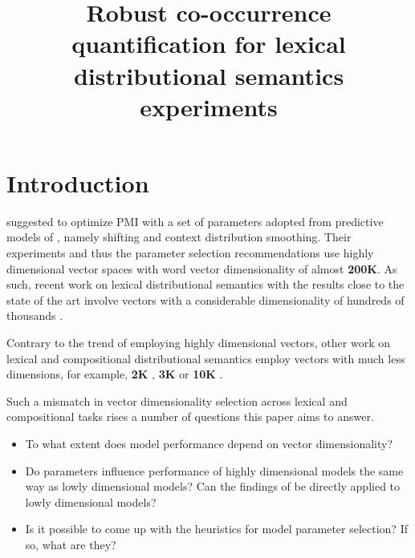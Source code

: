 \documentclass[11pt]{article}
\title{Robust co-occurrence quantification for lexical distributional semantics experiments}
\date{}
\begin{document}
\def\emnlp/{\textit{KS2013}}
\def\PhraseRel/{PhraseRel}

\def\PMI/{$1 \operatorname{PMI}$}
\def\SPMI/{$1 \operatorname{SPMI}$}
\def\CPMI/{$1 \operatorname{CPMI}$}
\def\SCPMI/{$1 \operatorname{SCPMI}$}

\def\NPMI/{$n \operatorname{PMI}$}
\def\NSPMI/{$n \operatorname{SPMI}$}
\def\NCPMI/{$n \operatorname{CPMI}$}
\def\NSCPMI/{$n \operatorname{SCPMI}$}

\def\logNPMI/{$\log n\operatorname{PMI}$}
\def\logNSPMI/{$\log n\operatorname{SPMI}$}
\def\logNCPMI/{$\log n \operatorname{CPMI}$}
\def\logNSCPMI/{$\log n \operatorname{SCPMI}$}

\maketitle
\begin{abstract}

\end{abstract}

\section{Introduction}
\label{sec:introduction}

 suggested to optimize PMI with a  set of parameters adopted from predictive models of , namely shifting and context distribution smoothing. Their experiments and thus the parameter selection recommendations use highly dimensional vector spaces with word vector  dimensionality of almost \textbf{200K}. As such, recent work on lexical distributional semantics with the results close to the state of the art involve vectors with a considerable dimensionality of hundreds of thousands \cite{baroni-dinu-kruszewski:2014:P14-1,kiela-clark:2014:CVSC,lapesa2014large}.

Contrary to the trend of employing highly dimensional vectors, other work on lexical and compositional distributional semantics employ vectors with much less dimensions, for example, \textbf{2K} \cite{Grefenstette:2011:ESC:2145432.2145580,kartsadrqpl2014,milajevs-EtAl:2014:EMNLP2014}, \textbf{3K} \cite{Dinu:2010:MDS:1870658.1870771,milajevs-purver:2014:CVSC} or \textbf{10K} \cite{polajnar-clark:2014:EACL,Baroni2010nouns}.

Such a mismatch in vector dimensionality selection across lexical and compositional tasks rises a number of questions this paper aims to answer.
\begin{itemize}
\item To what extent does model performance depend on vector dimensionality?
\item Do parameters influence performance of highly dimensional models the same way as lowly dimensional models? Can the findings of  be directly applied to lowly dimensional models?
\item Is it possible to come up with the heuristics for model parameter selection? If so, what are they?
\end{itemize}
\end{document}
